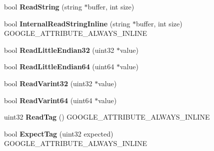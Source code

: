 \begin{DoxyCompactItemize}
\mbox{\label{classgoogle_1_1protobuf_1_1io_1_1CodedInputStream_a40bf2947a82b34bbd851eda2f5a3f1b8}} 
bool {\bfseries Read\+String} (string $\ast$buffer, int size)
\item 
\mbox{\label{classgoogle_1_1protobuf_1_1io_1_1CodedInputStream_a7b555fa9551b9fc5d46416cb78d0c38d}} 
bool {\bfseries Internal\+Read\+String\+Inline} (string $\ast$buffer, int size) G\+O\+O\+G\+L\+E\+\_\+\+A\+T\+T\+R\+I\+B\+U\+T\+E\+\_\+\+A\+L\+W\+A\+Y\+S\+\_\+\+I\+N\+L\+I\+NE
\item 
\mbox{\label{classgoogle_1_1protobuf_1_1io_1_1CodedInputStream_a3104dc45643c6f4c90db0323b5b719b8}} 
bool {\bfseries Read\+Little\+Endian32} (uint32 $\ast$value)
\item 
\mbox{\label{classgoogle_1_1protobuf_1_1io_1_1CodedInputStream_a13c3d476d6b5c268156f4deda61cbd25}} 
bool {\bfseries Read\+Little\+Endian64} (uint64 $\ast$value)
\item 
\mbox{\label{classgoogle_1_1protobuf_1_1io_1_1CodedInputStream_ab783ab1e0e43f710eba806ac7ef1928d}} 
bool {\bfseries Read\+Varint32} (uint32 $\ast$value)
\item 
\mbox{\label{classgoogle_1_1protobuf_1_1io_1_1CodedInputStream_af4e6c6127ed64e4978b389c812cff872}} 
bool {\bfseries Read\+Varint64} (uint64 $\ast$value)
\item 
\mbox{\label{classgoogle_1_1protobuf_1_1io_1_1CodedInputStream_a94fcd6bcde71e1cc804397f672f603c4}} 
uint32 {\bfseries Read\+Tag} () G\+O\+O\+G\+L\+E\+\_\+\+A\+T\+T\+R\+I\+B\+U\+T\+E\+\_\+\+A\+L\+W\+A\+Y\+S\+\_\+\+I\+N\+L\+I\+NE
\item 
\mbox{\label{classgoogle_1_1protobuf_1_1io_1_1CodedInputStream_acbb03271f93962689a09c756c64b412b}} 
bool {\bfseries Expect\+Tag} (uint32 expected) G\+O\+O\+G\+L\+E\+\_\+\+A\+T\+T\+R\+I\+B\+U\+T\+E\+\_\+\+A\+L\+W\+A\+Y\+S\+\_\+\+I\+N\+L\+I\+NE

\end{DoxyCompactItemize}
